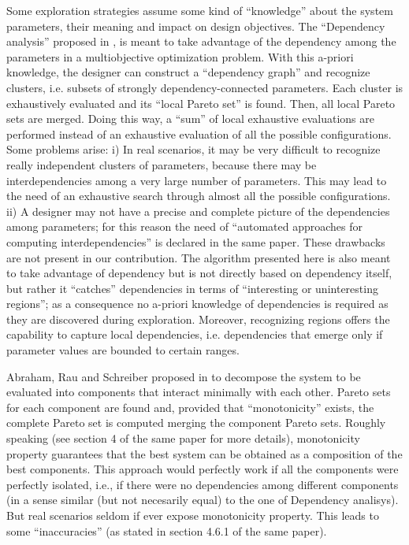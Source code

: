Some exploration strategies assume some kind of ``knowledge'' about
the system parameters, their meaning and impact on design objectives.
The ``Dependency analysis'' proposed in \cite{givargis_tvlsi02}, is meant
to take advantage of the dependency among the parameters in a multiobjective
optimization problem.  With this a-priori knowledge, the designer can construct a
``dependency graph'' and recognize clusters, i.e. subsets of strongly
dependency-connected parameters. Each cluster is exhaustively evaluated
and its ``local Pareto set'' is found. Then, all local Pareto sets
are merged. Doing this way, a ``sum'' of local exhaustive evaluations
are performed instead of an exhaustive evaluation of all the possible
configurations. Some problems arise: i) In real scenarios, it may
be very difficult to recognize really independent clusters of parameters,
because there may be interdependencies among a very large number of
parameters. This may lead to the need of an exhaustive search through
almost all the possible configurations. ii) A designer may not have
a precise and complete picture of the dependencies among parameters;
for this reason the need of ``automated approaches for computing interdependencies'' is declared in the same paper. 
These drawbacks are not present in our contribution. The algorithm presented
here is also meant to take advantage of dependency but is not directly
based on dependency itself, but rather it ``catches'' dependencies
in terms of ``interesting or uninteresting regions''; as a consequence
no a-priori knowledge of dependencies is required as they are discovered
during exploration. Moreover, recognizing regions offers the capability
to capture local dependencies,  i.e. dependencies that
emerge only if parameter values are bounded to certain ranges.


Abraham, Rau and Schreiber proposed in \cite{santosh_hptr00} to decompose
the system to be evaluated into components that interact minimally
with each other. Pareto sets for each component are found and, provided
that ``monotonicity'' exists, the complete Pareto set is computed
merging the component Pareto sets. Roughly speaking (see section 4
of the same paper for more details), monotonicity property guarantees
that the best system can be obtained as a composition of the best
components. This approach would perfectly work if all the components
were perfectly isolated, i.e., if there were no dependencies among
different components (in a sense similar (but not necesarily equal)
to the one of Dependency analisys). But real scenarios seldom if ever
expose monotonicity property. This leads to some ``inaccuracies''
(as stated in section 4.6.1 of the same paper).

